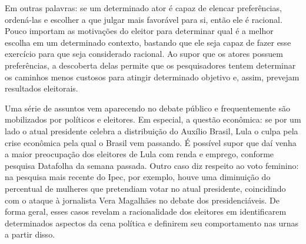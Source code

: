 Em outras palavras: se um determinado ator é capaz de elencar preferências, ordená-las e escolher a que julgar mais favorável para si, então ele é racional. Pouco importam as motivações do eleitor para determinar qual é a melhor escolha em um determinado contexto, bastando que ele seja capaz de fazer esse exercício para que seja considerado racional. Ao supor que os atores possuem preferências, a descoberta delas permite que os pesquisadores tentem determinar os caminhos menos custosos para atingir determinado objetivo e, assim, prevejam resultados eleitorais. 

Uma série de assuntos vem aparecendo no debate público e frequentemente são mobilizados por políticos e eleitores. Em especial, a questão econômica: se por um lado o atual presidente celebra a distribuição do Auxílio Brasil, Lula o culpa pela crise econômica pela qual o Brasil vem passando. É possível supor que daí venha a maior preocupação dos eleitores de Lula com renda e emprego, conforme pesquisa Datafolha da semana passada. Outro caso diz respeito ao voto feminino: na pesquisa mais recente do Ipec, por exemplo, houve uma diminuição do percentual de mulheres que pretendiam votar no atual presidente, coincidindo com o ataque à jornalista Vera Magalhães no debate dos presidenciáveis. De forma geral, esses casos revelam a racionalidade dos eleitores em identificarem determinados aspectos da cena política e definirem seu comportamento nas urnas a partir disso. \\


